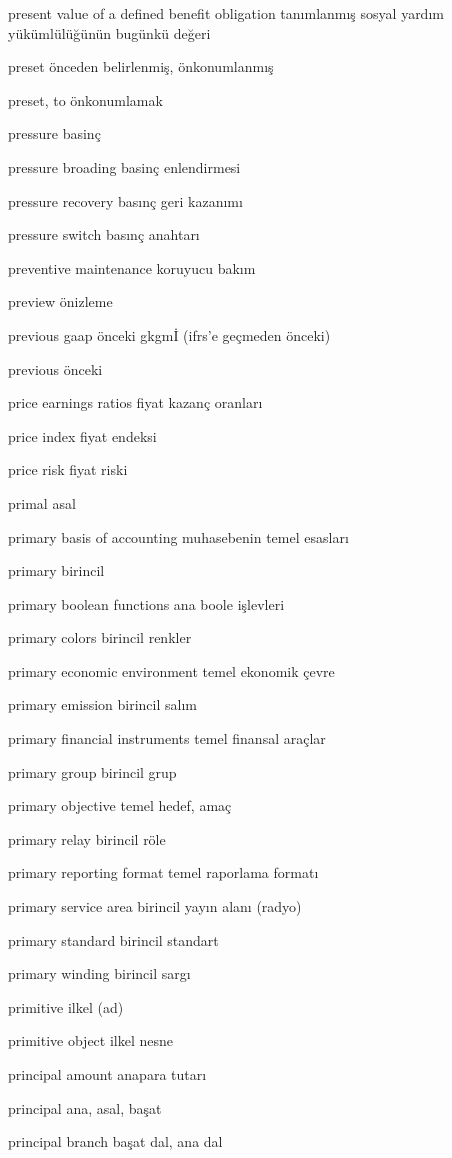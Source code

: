 \documentclass[12pt,fleqn]{article}\usepackage{../../common}
\begin{document}
present value of a defined benefit obligation tanımlanmış sosyal yardım yükümlülüğünün bugünkü değeri

preset önceden belirlenmiş, önkonumlanmış

preset, to önkonumlamak

pressure basinç

pressure broading basinç enlendirmesi

pressure recovery basınç geri kazanımı

pressure switch basınç anahtarı

preventive maintenance koruyucu bakım

preview önizleme

previous gaap önceki gkgmİ (ifrs'e geçmeden önceki)

previous önceki

price earnings ratios fiyat kazanç oranları

price index fiyat endeksi

price risk fiyat riski

primal asal

primary basis of accounting muhasebenin temel esasları

primary birincil

primary boolean functions ana boole işlevleri

primary colors birincil renkler

primary economic environment temel ekonomik çevre

primary emission birincil salım

primary financial instruments temel finansal araçlar

primary group birincil grup

primary objective temel hedef, amaç

primary relay birincil röle

primary reporting format temel raporlama formatı

primary service area birincil yayın alanı (radyo)

primary standard birincil standart

primary winding birincil sargı

primitive ilkel (ad)

primitive object ilkel nesne

principal amount anapara tutarı

principal ana, asal, başat

principal branch başat dal, ana dal
\end{document}
